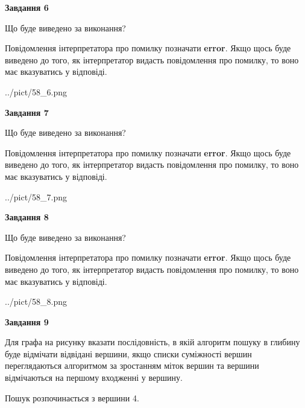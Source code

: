 \documentclass[12pt, ukrainian]{article}
\begin{document}
{\begin {large}
{\begin {center}\textbf{Завдання 6}\end {center}}\par
Що буде виведено за виконання?

Повідомлення інтерпретатора про помилку позначати \textbf{error}.
Якщо щось буде виведено до того, як інтерпретатор видасть повідомлення про помилку, 
то воно має вказуватись у відповіді. \par


\begin{center}
	{../pict/58_6.png}
\end{center}
\newpage

{\begin {center}\textbf{Завдання 7}\end {center}}\par
Що буде виведено за виконання?

Повідомлення інтерпретатора про помилку позначати \textbf{error}.
Якщо щось буде виведено до того, як інтерпретатор видасть повідомлення про помилку, 
то воно має вказуватись у відповіді. \par


\begin{center}
	{../pict/58_7.png}
\end{center}
\newpage

{\begin {center}\textbf{Завдання 8}\end {center}}\par
Що буде виведено за виконання?

Повідомлення інтерпретатора про помилку позначати \textbf{error}.
Якщо щось буде виведено до того, як інтерпретатор видасть повідомлення про помилку, 
то воно має вказуватись у відповіді. \par


\begin{center}
	{../pict/58_8.png}
\end{center}
\newpage

{\begin {center}\textbf{Завдання 9}\end {center}}\par
Для графа на рисунку вказати послідовність, в якій алгоритм пошуку в глибину буде відмічати відвідані вершини, якщо списки суміжності вершин переглядаються алгоритмом за зростанням міток вершин та вершини відмічаються на першому вход\-женні у вершину.\par
Пошук розпочинається з вершини 4.\par


\end{large}}
\end{document}
